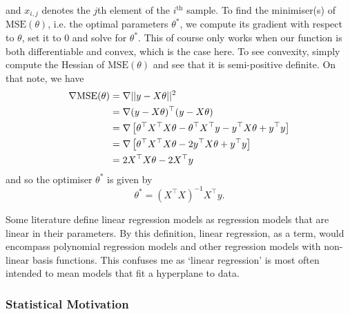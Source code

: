 \documentclass[11pt]{article}
\begin{document}
and $x_{i,j}$ denotes the $j$th element of the $i^{\text{th}}$ sample. To find the minimiser(s) of $\text{MSE}(\theta)$, i.e. the optimal parameters $\theta^{*}$, we compute its gradient with respect to $\theta$, set it to $0$ and solve for $\theta^{*}$. This of course only works when our function is both differentiable and convex, which is the case here. To see convexity, simply compute the Hessian of $\text{MSE}(\theta)$ and see that it is semi-positive definite. On that note, we have
\begin{align*}
    \nabla\text{MSE}(\theta)
    &=
    \nabla||y-X\theta||^2\\
    &=
    \nabla(y-X\theta)^{\top}(y-X\theta)\\
    &=
    \nabla\left[\theta^{\top}X^{\top}X\theta-\theta^{\top}X^{\top}y-y^{\top}X\theta+y^{\top}y\right]\\
    &=
    \nabla\left[\theta^{\top}X^{\top}X\theta-2y^{\top}X\theta+y^{\top}y\right]\\
    &=
    2X^{\top}X\theta-2X^{\top}y
\end{align*}
and so the optimiser $\theta^{*}$ is given by
$$
\theta^{*}=(X^{\top}X)^{-1}X^{\top}y.
$$

\begin{tcolorbox}[title={\centering\textbf{What does the `linear' in linear regression really refer to?}}, colback=myLightBlue, colbacktitle=myDarkBlue, colframe=myDarkBlue, coltitle=white]
    Some literature define linear regression models as regression models that are linear in their parameters. By this definition, linear regression, as a term, would encompass polynomial regression models and other regression models with non-linear basis functions. This confuses me as `linear regression' is most often intended to mean models that fit a hyperplane to data.
\end{tcolorbox}

\subsubsection{Statistical Motivation}
\end{document}
